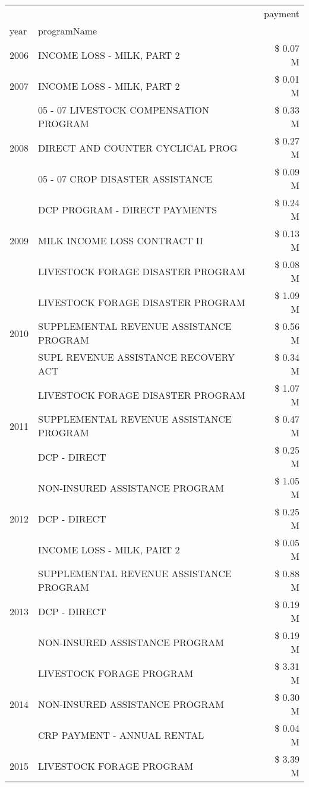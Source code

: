 \begin{tabular}{llr}
\toprule
 &  & payment \\
year & programName &  \\
\midrule
2006 & INCOME LOSS - MILK, PART 2 & \$ 0.07 M \\
\cline{1-3}
2007 & INCOME LOSS - MILK, PART 2 & \$ 0.01 M \\
\cline{1-3}
\multirow[t]{3}{*}{2008} & 05 - 07 LIVESTOCK COMPENSATION PROGRAM & \$ 0.33 M \\
 & DIRECT AND COUNTER CYCLICAL PROG & \$ 0.27 M \\
 & 05 - 07 CROP DISASTER ASSISTANCE & \$ 0.09 M \\
\cline{1-3}
\multirow[t]{3}{*}{2009} & DCP PROGRAM - DIRECT PAYMENTS & \$ 0.24 M \\
 & MILK INCOME LOSS CONTRACT II & \$ 0.13 M \\
 & LIVESTOCK FORAGE DISASTER  PROGRAM & \$ 0.08 M \\
\cline{1-3}
\multirow[t]{3}{*}{2010} & LIVESTOCK FORAGE DISASTER  PROGRAM & \$ 1.09 M \\
 & SUPPLEMENTAL REVENUE ASSISTANCE PROGRAM & \$ 0.56 M \\
 & SUPL REVENUE ASSISTANCE RECOVERY ACT & \$ 0.34 M \\
\cline{1-3}
\multirow[t]{3}{*}{2011} & LIVESTOCK FORAGE DISASTER PROGRAM & \$ 1.07 M \\
 & SUPPLEMENTAL REVENUE ASSISTANCE PROGRAM & \$ 0.47 M \\
 & DCP - DIRECT & \$ 0.25 M \\
\cline{1-3}
\multirow[t]{3}{*}{2012} & NON-INSURED ASSISTANCE PROGRAM & \$ 1.05 M \\
 & DCP - DIRECT & \$ 0.25 M \\
 & INCOME LOSS - MILK, PART 2 & \$ 0.05 M \\
\cline{1-3}
\multirow[t]{3}{*}{2013} & SUPPLEMENTAL REVENUE ASSISTANCE PROGRAM & \$ 0.88 M \\
 & DCP - DIRECT & \$ 0.19 M \\
 & NON-INSURED ASSISTANCE PROGRAM & \$ 0.19 M \\
\cline{1-3}
\multirow[t]{3}{*}{2014} & LIVESTOCK FORAGE PROGRAM & \$ 3.31 M \\
 & NON-INSURED ASSISTANCE PROGRAM & \$ 0.30 M \\
 & CRP PAYMENT - ANNUAL RENTAL & \$ 0.04 M \\
\cline{1-3}
\multirow[t]{3}{*}{2015} & LIVESTOCK FORAGE PROGRAM & \$ 3.39 M \\

\end{tabular}
